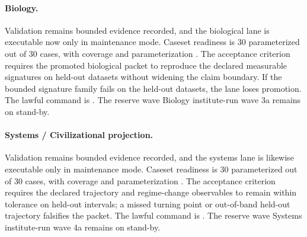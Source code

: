 \paragraph{Biology.}
Validation remains bounded evidence recorded, and the biological lane is executable now
only in maintenance mode. Caseset readiness is 30 parameterized out of 30
cases, with coverage  and parameterization
. The acceptance criterion requires
the promoted biological packet to reproduce the declared measurable signatures
on held-out datasets without widening the claim boundary. If the bounded
signature family fails on the held-out datasets, the lane loses promotion. The
lawful command is
. The reserve wave
Biology institute-run wave 3a remains on stand-by.

\paragraph{Systems / Civilizational projection.}
Validation remains bounded evidence recorded, and the systems lane is likewise executable
only in maintenance mode. Caseset readiness is 30 parameterized out of 30
cases, with coverage  and parameterization
. The acceptance criterion requires
the declared trajectory and regime-change observables to remain within
tolerance on held-out intervals; a missed turning point or out-of-band held-out
trajectory falsifies the packet. The lawful command is
. The reserve wave
Systems institute-run wave 4a remains on stand-by.

\endgroup
